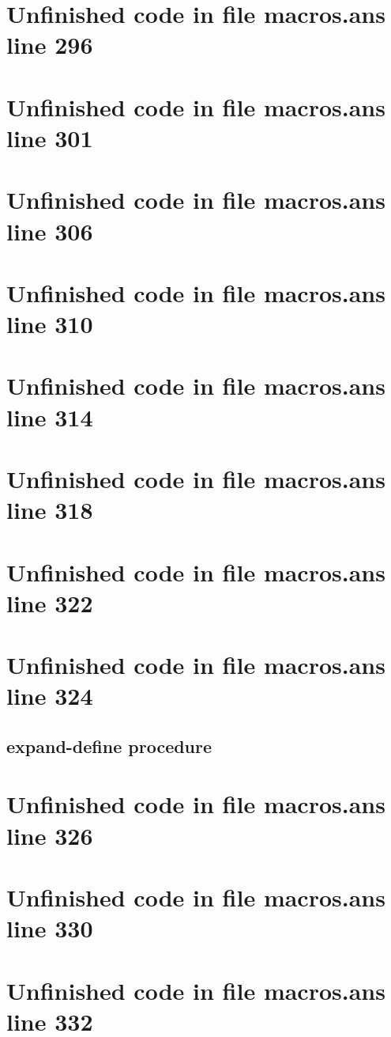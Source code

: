 \documentclass[twoside,9pt]{report}
\begin{document}
\section{Unfinished code in file macros.ans line 296}
\section{Unfinished code in file macros.ans line 301}
\section{Unfinished code in file macros.ans line 306}
\section{Unfinished code in file macros.ans line 310}
\section{Unfinished code in file macros.ans line 314}
\section{Unfinished code in file macros.ans line 318}
\section{Unfinished code in file macros.ans line 322}
\section{Unfinished code in file macros.ans line 324}
\subsection{expand-define procedure}
\label{expand-define-procedure}
\section{Unfinished code in file macros.ans line 326}

\section{Unfinished code in file macros.ans line 330}
\section{Unfinished code in file macros.ans line 332}
\end{document}
